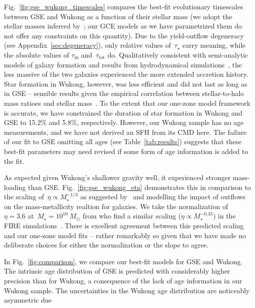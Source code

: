 \documentclass[ms.tex]{subfiles}
\begin{document}
Fig.~\ref{fig:gse_wukong_timescales} compares the best-fit evolutionary
timescales between GSE and Wukong as a function of their stellar mass (we adopt
the stellar masses inferred by~\citealt{Naidu2021, Naidu2022}; our GCE models
as we have parametrized them do not offer any constraints on this quantity).
Due to the yield-outflow degeneracy (see Appendix~\ref{sec:degeneracy}), only
relative values of~$\tau_\star$ carry meaning, while the absolute values of
$\tau_\text{in}$ and~$\tau_\text{tot}$ do.
Qualitatively consistent with semi-analytic models of galaxy formation
\citep[e.g.,][]{Baugh2006, Somerville2015a, Behroozi2019} and results from
hydrodynamical simulations~\citep[e.g.,][]{GarrisonKimmel2019}, the less
massive of the two galaxies experienced the more extended accretion history.
Star formation in Wukong, however, was less efficient and did not last as long
as in GSE -- sensible results given the empirical correlation between
stellar-to-halo mass ratioes and stellar mass~\citep{Hudson2015}.
To the extent that our one-zone model framework is accurate, we have
constrained the duration of star formation in Wukong and GSE to 15.2\% and
5.8\%, respectively.
However, our Wukong sample has no age measurements, and we have not derived
an SFH from its CMD here.
The failure of our fit to GSE omitting all ages (see Table~\ref{tab:results})
suggests that these best-fit parameters may need revised if some form of age
information is added to the fit.
\par
As expected given Wukong's shallower gravity well, it experienced stronger
mass-loading than GSE.
Fig.~\ref{fig:gse_wukong_eta} demonstrates this in comparison to the scaling
of~$\eta \propto M_\star^{-1/3}$ as suggested by~\citet{Finlator2008} and
\citet{Peeples2011} modelling the impact of outflows on the mass-metallicity
realtion for galaxies.
We take the normalization of~$\eta = 3.6$ at~$M_\star = 10^{10}~M_\odot$ from
\citet{Muratov2015} who find a similar scaling ($\eta \propto M_\star^{-0.35}$)
in the FIRE simulations~\citep{Hopkins2014}.
There is excellent agreement between this predicted scaling and our one-zone
model fits -- rather remarkably so given that we have made no deliberate
choices for either the normalization or the slope to agree.
\par
In Fig.~\ref{fig:comparison}, we compare our best-fit models for GSE and Wukong.
The intrinsic age distribution of GSE is predicted with considerably higher
precision than for Wukong, a consequence of the lack of age information in our
Wukong sample.
The uncertainties in the Wukong age distribution are noticeably asymmetric due
\end{document}

